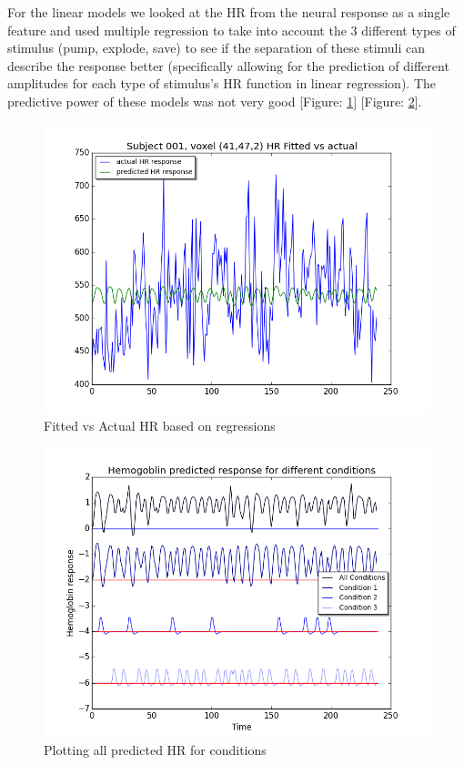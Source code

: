 \par  For the linear models we looked at the HR from the neural response as a single feature and used multiple regression to take into account the 3 different types of stimulus (pump, explode, save) to see if the separation of these stimuli can describe the response better (specifically allowing for the prediction of different amplitudes for each type of stimulus's HR function in linear regression). The predictive power of these models was not very good [Figure: \ref{fig:fit_vs_act}] [Figure: \ref{fig:all_cond_time}]. 

\begin{figure}[ht]
\centering
\includegraphics[scale=.5]{images/fitted_vs_actual_mult_regression}
\caption{Fitted vs Actual HR based on regressions}
\label{fig:fit_vs_act}
\end{figure}

  
\begin{figure}[ht]
\centering
\includegraphics[scale=.5]{images/all_cond_time}  
\caption{Plotting all predicted HR for conditions}
\label{fig:all_cond_time}
\end{figure}


